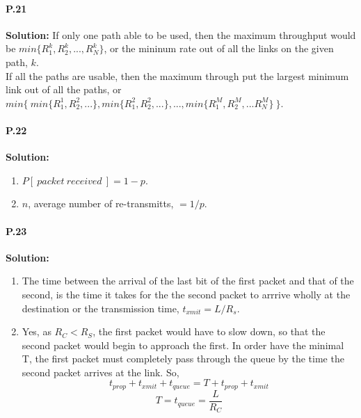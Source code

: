 \documentclass[12pt]{article}
\begin{document}
\paragraph{P.21\\}                                                                                                                                                
\textbf{Solution:}
If only one path able to be used, then the maximum throughput would be $min\{ R^k_1, R^k_2,...,R^k_N\}$, or the mininum rate out of all the links on the given path, $k$.\\If all the paths are usable, then the maximum through put the largest minimum link out of all the paths, or $min\{\ min\{R^1_1, R^2_2,...\}, min\{R^2_1, R^2_2,...\},...,min\{R^M_1, R^M_2,...R^M_N\}\ \}$. 


\paragraph{P.22\\}                                                                                                                                                     
\textbf{Solution:}
\begin{enumerate}[label = \alph*)]
\item $P[ \ packet\ received\  ] = 1 - p$.
\item $n$, average number of re-transmitts, $ = 1/p$.
\end{enumerate}

                                                                                                          
\paragraph{P.23\\}                                                                                                                                                     
\textbf{Solution:}
\begin{enumerate}[label = \alph*) ]
\item The time between the arrival of the last bit of the first packet and that of the second, is the time it takes for the the second packet to arrrive wholly at the destination or the transmission time, $t_{xmit} = L/R_s$. 
\item Yes, as $R_C<R_S$, the first packet would have to slow down, so that the second packet would begin to approach the first. In order have the minimal T, the first packet must completely pass through the queue by the time the second packet arrives at the link. So,\\
$$t_{prop} + t_{xmit} + t_{queue} = T + t_{prop} + t_{xmit}$$
$$T = t_{queue} = \frac{L}{R_C}$$
\end{enumerate}
\end{document}
